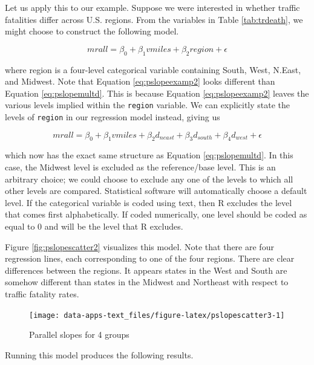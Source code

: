 \documentclass[
]{book}
\begin{document}
Let us apply this to our example. Suppose we were interested in whether traffic fatalities differ across U.S. regions. From the variables in Table \ref{tab:trdeath}, we might choose to construct the following model.

\begin{equation}
mrall = \beta_0 + \beta_1vmiles + \beta_2region + \epsilon
\label{eq:pslopeexamp2}
\end{equation}

where region is a four-level categorical variable containing South, West, N.East, and Midwest. Note that Equation \eqref{eq:pslopeexamp2} looks different than Equation \eqref{eq:pslopemultd}. This is because Equation \eqref{eq:pslopeexamp2} leaves the various levels implied within the \texttt{region} variable. We can explicitly state the levels of \texttt{region} in our regression model instead, giving us

\begin{equation}
mrall = \beta_0 + \beta_1vmiles + \beta_2d_{neast} + \beta_3d_{south} + \beta_4d_{west} + \epsilon
\label{eq:pslopeexamp3}
\end{equation}

which now has the exact same structure as Equation \eqref{eq:pslopemultd}. In this case, the Midwest level is excluded as the reference/base level. This is an arbitrary choice; we could choose to exclude any one of the levels to which all other levels are compared. Statistical software will automatically choose a default level. If the categorical variable is coded using text, then R excludes the level that comes first alphabetically. If coded numerically, one level should be coded as equal to 0 and will be the level that R excludes.

Figure \ref{fig:pslopescatter2} visualizes this model. Note that there are four regression lines, each corresponding to one of the four regions. There are clear differences between the regions. It appears states in the West and South are somehow different than states in the Midwest and Northeast with respect to traffic fatality rates.

\begin{figure}

{\centering \texttt{[image: data-apps-text\_files/figure-latex/pslopescatter3-1]} 

}

\caption{Parallel slopes for 4 groups}\label{fig:pslopescatter3}
\end{figure}

Running this model produces the following results.
\end{document}
